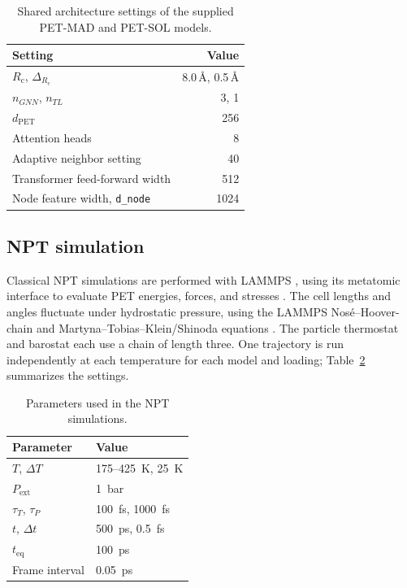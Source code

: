 \documentclass[12pt,a4paper]{article}
\numberwithin{equation}{section}
\begin{document}
\begin{table}[htbp]
\centering
\small
\begin{tabular}{lr}
  \toprule
  Setting & Value \\
  \midrule
  $R_{\mathrm{c}}$, $\Delta_{R_{\mathrm{c}}}$ & 8.0\,\AA, 0.5\,\AA \\
  $n_{GNN}$, $n_{TL}$ & 3, 1 \\
  $d_{\mathrm{PET}}$ & 256 \\
  Attention heads & 8 \\
  Adaptive neighbor setting & 40 \\
  Transformer feed-forward width & 512 \\
  Node feature width, \texttt{d\_\allowbreak{}node} & 1024 \\
  \bottomrule
\end{tabular}
\caption{Shared architecture settings of the supplied PET-MAD and PET-SOL models.}
\label{tab:pet-settings}
\end{table}

\pagebreak
\subsection{NPT simulation}
\label{sec:md-method}

Classical NPT simulations are performed with LAMMPS \cite{lammps}, using
its metatomic interface to evaluate PET energies, forces, and stresses
\cite{bigi2026metatomic}. The cell lengths and angles fluctuate under
hydrostatic pressure, using the LAMMPS Nos\'e--Hoover-chain and
Martyna--Tobias--Klein/Shinoda equations \cite{nhc,mtk,shinoda2004,lammps-npt}.
The particle thermostat and barostat each use a chain of length
three. One trajectory is run independently at each temperature for each
model and loading; Table~\ref{tab:md-settings} summarizes the settings.

\begin{table}[htbp]
  \centering
  \small
  \begin{tabular}{@{}ll@{}}
    \toprule
    Parameter & Value \\
    \midrule
    $T$, $\Delta T$ & 175--\SI{425}{K}, \SI{25}{K} \\
    $P_{\mathrm{ext}}$ & \SI{1}{bar} \\
    $\tau_{T}$, $\tau_{P}$ & \SI{100}{fs}, \SI{1000}{fs} \\
    $t$, $\Delta t$ & \SI{500}{ps}, \SI{0.5}{fs} \\
    $t_{\mathrm{eq}}$ & \SI{100}{ps} \\
    Frame interval & \SI{0.05}{ps} \\
    \bottomrule
  \end{tabular}
  \caption{Parameters used in the NPT simulations.}
  \label{tab:md-settings}
\end{table}
\end{document}
